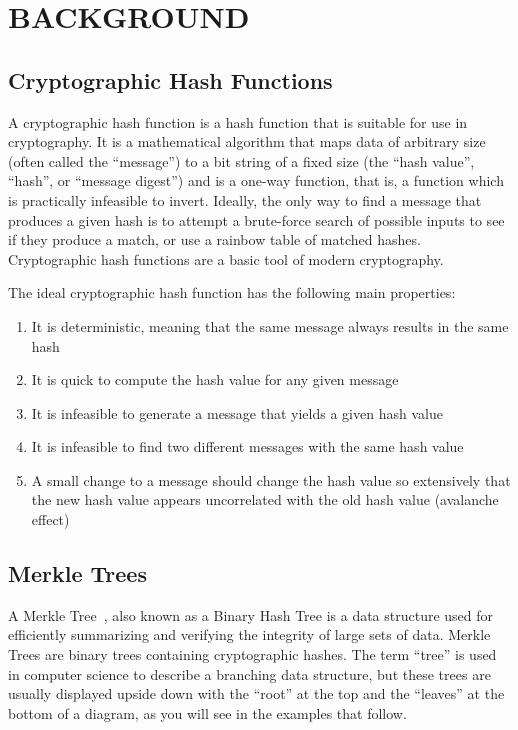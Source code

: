 \chapter{BACKGROUND}

\section{Cryptographic Hash Functions}

A cryptographic hash function is a hash function that is suitable for use
in cryptography. It is a mathematical algorithm that maps data of arbitrary
size (often called the ``message'') to a bit string of a fixed size (the ``hash
value'', ``hash'', or ``message digest'') and is a one-way function, that is, a
function which is practically infeasible to invert. Ideally, the only way to
find a message that produces a given hash is to attempt a brute-force search of
possible inputs to see if they produce a match, or use a rainbow table of
matched hashes. Cryptographic hash functions are a basic tool of modern
cryptography.

\noindent
The ideal cryptographic hash function has the following main properties:

\begin{enumerate}
\item It is deterministic, meaning that the same message always results in the same hash
\item It is quick to compute the hash value for any given message
\item It is infeasible to generate a message that yields a given hash value
\item It is infeasible to find two different messages with the same hash value
\item A small change to a message should change the hash value so extensively that the new hash value appears uncorrelated with the old hash value (avalanche effect)
\end{enumerate}

\section{Merkle Trees}

A Merkle Tree~\cite{merkle}, also known as a Binary Hash Tree is a data structure used for
efficiently summarizing and verifying the integrity of large sets of data.
Merkle Trees are binary trees containing cryptographic hashes. The term
``tree'' is used in computer science to describe a branching data structure,
but these trees are usually displayed upside down with the ``root'' at the top
and the ``leaves'' at the bottom of a diagram, as you will see in the examples
that follow.

